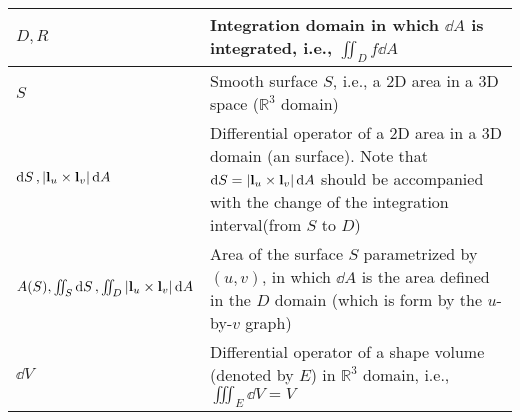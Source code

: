 \documentclass{article}
\begin{document}
\begin{xltabular}{\textwidth}{XX}
	\(D, R\)                                                                                                                                                                                                                                   & Integration domain in which \(\dd{A}\) is integrated, i.e., \(\iint_D f \dd{A}\) \cite{stewartCalculus2011}                                                                                                                                             \\ \hline
	\(S\)                                                                                                                                                                                                                                      & Smooth surface \(S\), i.e., a 2D area in a 3D space (\(\mathbb{R}^3\) domain)                                                                                                                                                                           \\ \hline
	\(\dd{S}, \abs{\mathbf{l}_u\times\mathbf{l}_v} \dd{A} \)                                                                                                                                                                                   & Differential operator of a 2D area in a 3D domain (an surface). Note that \(\dd{S} = \abs{\mathbf{l}_u\times\mathbf{l}_v} \dd{A}\) should be accompanied with the change of the integration interval(from \(S\) to \(D\))                               \\ \hline
	\(A(S), \iint_S \dd{S}, \iint_D \abs{\mathbf{l}_u\times\mathbf{l}_v} \dd{A}\)                                                                                                                                                              & Area of the surface \(S\) parametrized by \((u,v)\), in which \(\dd{A}\) is the area defined in the \(D\) domain (which is form by the \(u\)-by-\(v\) graph)                                                                                            \\ \hline
	\(\dd{V}\)                                                                                                                                                                                                                                 & Differential operator of a shape volume (denoted by \(E\)) in \(\mathbb{R}^3\) domain, i.e., \(\iiint_E \dd{V} = V\)                                                                                                                                    \\ \hline

\end{xltabular}
\end{document}
